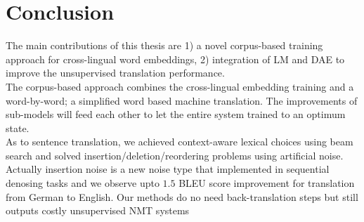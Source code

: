 \chapter{Conclusion}
%
%

The main contributions of this thesis are 1) a novel corpus-based training approach for cross-lingual word embeddings, 2) integration of LM and DAE to improve the unsupervised translation performance. \\
The corpus-based approach combines the cross-lingual embedding training and a word-by-word; a simplified word based machine translation. The improvements of sub-models will feed each other to let the entire system trained to an optimum state. \\
As to sentence translation, we achieved context-aware lexical choices using beam search and solved insertion/deletion/reordering problems using artificial noise. Actually insertion noise is a new noise type that implemented in sequential denosing tasks and we observe upto $1.5$ BLEU score improvement for translation from German to English.  Our methods do no need back-translation steps but still outputs costly unsupervised NMT systems 